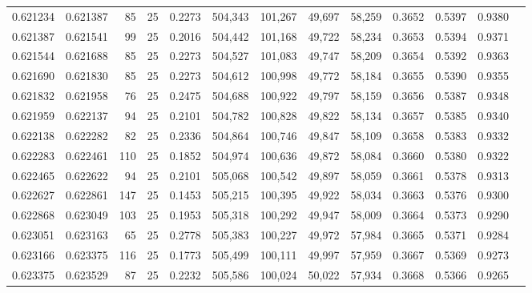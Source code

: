 \begin{tabular}{rrrrrrrrrrrrr}
0.621234 & 0.621387 &    85 &  25 &                                     0.2273 & 504,343 & 101,267 &  49,697 &  58,259 & 0.3652 & 0.5397 & 0.9380 \\
0.621387 & 0.621541 &    99 &  25 &                                     0.2016 & 504,442 & 101,168 &  49,722 &  58,234 & 0.3653 & 0.5394 & 0.9371 \\
0.621544 & 0.621688 &    85 &  25 &                                     0.2273 & 504,527 & 101,083 &  49,747 &  58,209 & 0.3654 & 0.5392 & 0.9363 \\
0.621690 & 0.621830 &    85 &  25 &                                     0.2273 & 504,612 & 100,998 &  49,772 &  58,184 & 0.3655 & 0.5390 & 0.9355 \\
0.621832 & 0.621958 &    76 &  25 &                                     0.2475 & 504,688 & 100,922 &  49,797 &  58,159 & 0.3656 & 0.5387 & 0.9348 \\
0.621959 & 0.622137 &    94 &  25 &                                     0.2101 & 504,782 & 100,828 &  49,822 &  58,134 & 0.3657 & 0.5385 & 0.9340 \\
0.622138 & 0.622282 &    82 &  25 &                                     0.2336 & 504,864 & 100,746 &  49,847 &  58,109 & 0.3658 & 0.5383 & 0.9332 \\
0.622283 & 0.622461 &   110 &  25 &                                     0.1852 & 504,974 & 100,636 &  49,872 &  58,084 & 0.3660 & 0.5380 & 0.9322 \\
0.622465 & 0.622622 &    94 &  25 &                                     0.2101 & 505,068 & 100,542 &  49,897 &  58,059 & 0.3661 & 0.5378 & 0.9313 \\
0.622627 & 0.622861 &   147 &  25 &                                     0.1453 & 505,215 & 100,395 &  49,922 &  58,034 & 0.3663 & 0.5376 & 0.9300 \\
0.622868 & 0.623049 &   103 &  25 &                                     0.1953 & 505,318 & 100,292 &  49,947 &  58,009 & 0.3664 & 0.5373 & 0.9290 \\
0.623051 & 0.623163 &    65 &  25 &                                     0.2778 & 505,383 & 100,227 &  49,972 &  57,984 & 0.3665 & 0.5371 & 0.9284 \\
0.623166 & 0.623375 &   116 &  25 &                                     0.1773 & 505,499 & 100,111 &  49,997 &  57,959 & 0.3667 & 0.5369 & 0.9273 \\
0.623375 & 0.623529 &    87 &  25 &                                     0.2232 & 505,586 & 100,024 &  50,022 &  57,934 & 0.3668 & 0.5366 & 0.9265 \\

\end{tabular}
